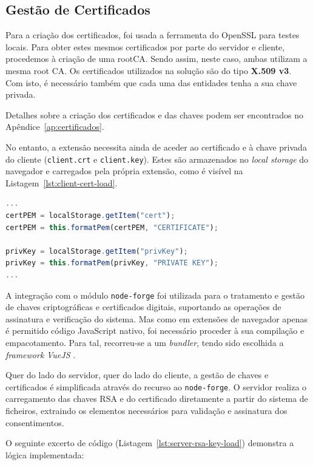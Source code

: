 \subsection{Gestão de Certificados}
Para a criação dos certificados, foi usada a ferramenta do OpenSSL para testes locais. Para obter estes mesmos certificados por parte do servidor e cliente, procedemos à criação de uma rootCA. Sendo assim, neste caso, ambas utilizam a mesma root CA. Os certificados utilizados na solução são do tipo \textbf{X.509 v3}. Com isto, é necessário também que cada uma das entidades tenha a sua chave privada.

Detalhes sobre a criação dos certificados e das chaves podem ser encontrados no Apêndice~\ref{ap:certificados}.

No entanto, a extensão necessita ainda de aceder ao certificado e à chave privada do cliente (\texttt{client.crt} e \texttt{client.key}). Estes são armazenados no \textit{local storage} do navegador e carregados pela própria extensão, como é visível na Listagem~\ref{lst:client-cert-load}.

\begin{lstlisting}[language=Javascript, caption={Carregamento do certificado e da chave privada do cliente a partir do \textit{local storage}}, label={lst:client-cert-load}]
...
certPEM = localStorage.getItem("cert");
certPEM = this.formatPem(certPEM, "CERTIFICATE");

privKey = localStorage.getItem("privKey");
privKey = this.formatPem(privKey, "PRIVATE KEY");
...
\end{lstlisting}

A integração com o módulo \texttt{node-forge} foi utilizada para o tratamento e gestão de chaves criptográficas e certificados digitais, suportando as operações de assinatura e verificação do sistema. Mas como em extensões de navegador apenas é permitido código JavaScript nativo, foi necessário proceder à sua compilação e empacotamento. Para tal, recorreu-se a um \textit{bundler}, tendo sido escolhida a \textit{framework} \textit{VueJS} \citep{VueJS}.

Quer do lado do servidor, quer do lado do cliente, a gestão de chaves e certificados é simplificada através do recurso ao \texttt{node-forge}. O servidor realiza o carregamento das chaves RSA e do certificado diretamente a partir do sistema de ficheiros, extraindo os elementos necessários para validação e assinatura dos consentimentos.

O seguinte excerto de código (Listagem~\ref{lst:server-rsa-key-load}) demonstra a lógica implementada:


